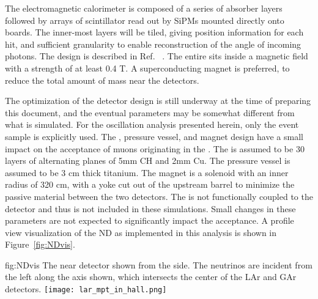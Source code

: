 The electromagnetic calorimeter is composed of a series of absorber layers followed by arrays of scintillator read out by SiPMs mounted directly onto boards. The inner-most layers will be tiled, giving \threed position information for each hit, and sufficient granularity to enable reconstruction of the angle of incoming photons. The  design is described in Ref. ~\cite{Emberger:2018pgr}. The entire  sits inside a magnetic field with a strength of at least 0.4 T. A superconducting magnet is preferred, to reduce the total amount of mass near the detectors.

The optimization of the detector design is still underway at the time of preparing this document, and the eventual parameters may be somewhat different from what is simulated. For the oscillation analysis presented herein, only the  event sample is explicitly used. The , pressure vessel, and magnet design have a small impact on the acceptance of muons originating in the . The  is assumed to be 30 layers of alternating planes of 5mm CH and 2mm Cu. The pressure vessel is assumed to be 3 cm thick titanium. The magnet is a solenoid with an inner radius of 320 cm, with a yoke cut out of the upstream barrel to minimize the passive material between the two  detectors. The  is not functionally coupled to the  detector and thus is not included in these simulations. Small changes in these parameters are not expected to significantly impact the acceptance. A profile view visualization of the ND as implemented in this analysis is shown in Figure~\ref{fig:NDvis}.

\begin{dunefigure}[ND visualization]{fig:NDvis}
{The near detector shown from the side. The neutrinos are incident from the left along the axis shown, which intersects the center of the LAr and GAr detectors.}
 \texttt{[image: lar\_mpt\_in\_hall.png]}
\end{dunefigure}

